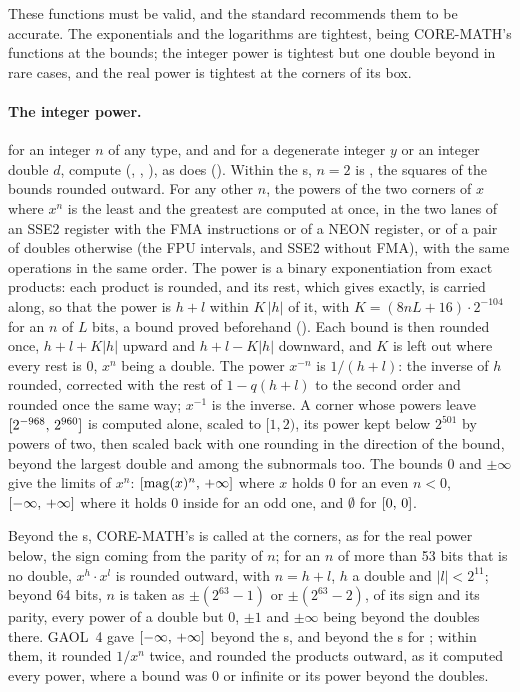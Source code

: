 \documentclass[12pt,a4paper,twoside,openright]{book}
\begin{document}
These functions must be valid, and the standard recommends them to be
accurate. The exponentials and the logarithms are tightest, being
CORE-MATH's functions at the bounds; the integer power is tightest but one
double beyond in rare cases, and the real power is tightest at the corners
of its box.

\paragraph{The integer power.}%
 for an integer $n$ of any type, and  and
 for a degenerate integer $y$ or an integer double $d$,
compute  (, ,
), as does 
(). Within the s, $n=2$ is , the
squares of the bounds rounded outward.\newinvfive{} For any other $n$, the
powers of the two corners of $x$ where $x^n$ is the least and the greatest
are computed at once, in the two lanes of an SSE2 register with the FMA
instructions or of a NEON register, or of a pair of doubles otherwise (the
FPU intervals, and SSE2 without FMA), with the same operations in the same
order.\newinvfive{} The power is a binary exponentiation from exact
products: each product is rounded, and its rest, which  gives
exactly, is carried along, so that the power is $h+l$ within $K\,|h|$ of
it, with $K=(8nL+16)\cdot2^{-104}$ for an $n$ of $L$ bits, a bound proved
beforehand (). Each bound is then
rounded once, $h+l+K|h|$ upward and $h+l-K|h|$ downward, and $K$ is left
out where every rest is $0$, $x^n$ being a double. The power $x^{-n}$ is
$1/(h+l)$: the inverse of $h$ rounded, corrected with the rest of
$1-q(h+l)$ to the second order and rounded once the same way; $x^{-1}$ is
the inverse. A corner whose powers leave $[2^{-968},\,2^{960}]$ is
computed alone, scaled to $[1, 2)$, its power kept below $2^{501}$ by
powers of two, then scaled back with one rounding in the direction of the
bound, beyond the largest double and among the subnormals too. The bounds
$0$ and $\pm\infty$ give the limits of $x^n$:
$[\mathrm{mag}(x)^n,\,+\infty]$ where $x$ holds $0$ for an even $n<0$,
$[-\infty,\,+\infty]$ where it holds $0$ inside for an odd one, and
$\emptyset$ for $[0,\,0]$.

Beyond the s, CORE-MATH's  is called at the corners,
as for the real power below, the sign coming from the parity of $n$; for an
$n$ of more than 53 bits that is no double, $x^h\cdot x^l$ is rounded
outward, with $n=h+l$, $h$ a double and $|l|<2^{11}$; beyond 64 bits, $n$
is taken as $\pm(2^{63}-1)$ or $\pm(2^{63}-2)$, of its sign and its parity,
every power of a double but $0$, $\pm1$ and $\pm\infty$ being beyond the
doubles there. GAOL~4 gave $[-\infty,\,+\infty]$ beyond the
s, and beyond the s for ;
within them, it rounded $1/x^n$ twice, and rounded the products outward, as
it computed every power, where a bound was $0$ or infinite or its power
beyond the doubles.\newinvfive
\end{document}
